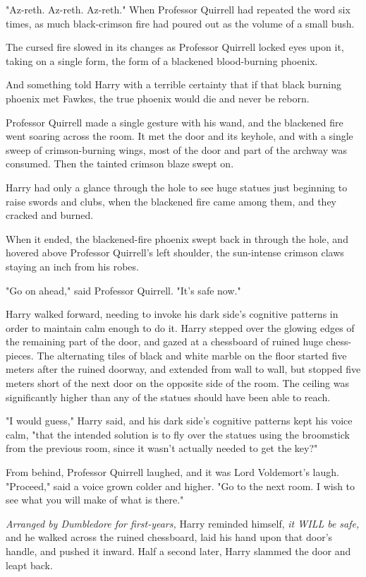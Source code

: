"Az-reth. Az-reth. Az-reth." When Professor Quirrell had repeated the word six
times, as much black-crimson fire had poured out as the volume of a small bush.

The cursed fire slowed in its changes as Professor Quirrell locked eyes upon
it, taking on a single form, the form of a blackened blood-burning phoenix.

And something told Harry with a terrible certainty that if that black burning
phoenix met Fawkes, the true phoenix would die and never be reborn.

Professor Quirrell made a single gesture with his wand, and the blackened fire
went soaring across the room. It met the door and its keyhole, and with a
single sweep of crimson-burning wings, most of the door and part of the archway
was consumed. Then the tainted crimson blaze swept on.

Harry had only a glance through the hole to see huge statues just beginning to
raise swords and clubs, when the blackened fire came among them, and they
cracked and burned.

When it ended, the blackened-fire phoenix swept back in through the hole, and
hovered above Professor Quirrell's left shoulder, the sun-intense crimson claws
staying an inch from his robes.

"Go on ahead," said Professor Quirrell. "It's safe now."

Harry walked forward, needing to invoke his dark side's cognitive patterns in
order to maintain calm enough to do it. Harry stepped over the glowing edges of
the remaining part of the door, and gazed at a chessboard of ruined huge
chess-pieces. The alternating tiles of black and white marble on the floor
started five meters after the ruined doorway, and extended from wall to wall,
but stopped five meters short of the next door on the opposite side of the
room. The ceiling was significantly higher than any of the statues should have
been able to reach.

"I would guess," Harry said, and his dark side's cognitive patterns kept his
voice calm, "that the intended solution is to fly over the statues using the
broomstick from the previous room, since it wasn't actually needed to get the
key?"

From behind, Professor Quirrell laughed, and it was Lord Voldemort's laugh.
"Proceed," said a voice grown colder and higher. "Go to the next room. I wish
to see what you will make of what is there."

\emph{Arranged by Dumbledore for first-years,} Harry reminded himself, \emph{it
WILL be safe,} and he walked across the ruined chessboard, laid his hand upon
that door's handle, and pushed it inward.
\sbreak
Half a second later, Harry slammed the door and leapt back.


